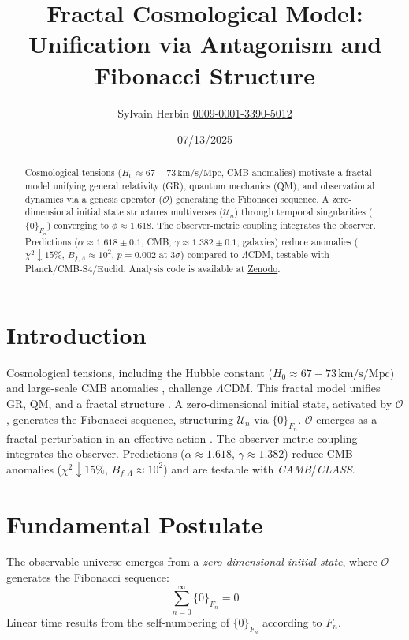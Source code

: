 \documentclass[aps,prl,twocolumn,groupedaddress]{revtex4-2}
\newcommand{\F}[1]{F_{#1}}
\newcommand{\U}[1]{\mathcal{U}_{#1}}
\newcommand{\phiapprox}{\phi \approx 1.618}
\newcommand{\Opp}{\mathcal{O}}
\newcommand{\presets}{\{0\}_{\F{n}}}
\begin{document}
\title{Fractal Cosmological Model: Unification via Antagonism and Fibonacci Structure}
\author{Sylvain Herbin \href{https://orcid.org/0009-0001-3390-5012}{0009-0001-3390-5012}}
\date{07/13/2025}

\begin{abstract}
Cosmological tensions (\(H_0 \approx 67-73 \, \text{km/s/Mpc}\), CMB anomalies) motivate a fractal model unifying general relativity (GR), quantum mechanics (QM), and observational dynamics via a genesis operator (\(\Opp\)) generating the Fibonacci sequence. A zero-dimensional initial state structures multiverses (\(\U{n}\)) through temporal singularities (\(\presets\)) converging to \(\phiapprox\). The observer-metric coupling integrates the observer. Predictions (\(\alpha \approx 1.618 \pm 0.1\), CMB; \(\gamma \approx 1.382 \pm 0.1\), galaxies) reduce anomalies (\(\chi^2 \downarrow 15\%\), \(B_{f,\Lambda} \approx 10^2\), \(p = 0.002\) at \(3\sigma\)) compared to \(\Lambda\)CDM, testable with Planck/CMB-S4/Euclid. Analysis code is available at \href{https://zenodo.org}{Zenodo}.
\end{abstract}

\maketitle

\section{Introduction}
Cosmological tensions, including the Hubble constant (\(H_0 \approx 67-73 \, \text{km/s/Mpc}\)) \cite{divalentino2021} and large-scale CMB anomalies \cite{planck}, challenge \(\Lambda\)CDM. This fractal model unifies GR, QM, and a fractal structure \cite{nottale}. A zero-dimensional initial state, activated by \(\Opp\), generates the Fibonacci sequence, structuring \(\U{n}\) via \(\presets\). \(\Opp\) emerges as a fractal perturbation in an effective action \cite{chernsimons}. The observer-metric coupling \cite{zeh,zurek} integrates the observer. Predictions (\(\alpha \approx 1.618\), \(\gamma \approx 1.382\)) reduce CMB anomalies (\(\chi^2 \downarrow 15\%\), \(B_{f,\Lambda} \approx 10^2\)) and are testable with \textit{CAMB}/\textit{CLASS}.

\section{Fundamental Postulate}
The observable universe emerges from a \emph{zero-dimensional initial state}, where \(\Opp\) generates the Fibonacci sequence:
\begin{equation}
\sum_{n=0}^\infty \presets = 0
\label{eq:sum_zero}
\end{equation}
Linear time results from the self-numbering of \(\presets\) according to \(\F{n}\).
\end{document}
